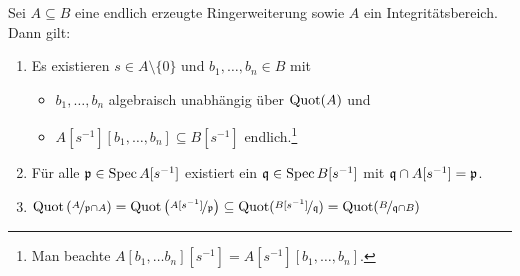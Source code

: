 \documentclass[12pt,a4paper]{scrartcl}
\theoremstyle{cplain}
\theoremstyle{cdef}
\begin{document}
\begin{kor} \label{kor:7.17}
	Sei $A \subseteq B$ eine endlich erzeugte Ringerweiterung sowie $A$ ein Integritätsbereich. Dann gilt: 
	\begin{enumerate}
		\item \label{kor:7.17:i} Es existieren $s \in A \setminus \{0\}$ und $b_1, \dots , b_n \in B$ mit
		\begin{itemize}
			\item $b_1, \dots , b_n$ algebraisch unabhängig über $\operatorname{Quot}(A)$ und
			\item $A[s^{-1}][b_1,\dots , b_n] \subseteq B[s^{-1}]$ endlich.\footnote{Man beachte $A[b_1, \dots b_n][s^{-1}]=A[s^{-1}][b_1, \dots , b_n]$.}
		\end{itemize}
		\item Für alle $\mathfrak{p}\in\operatorname{Spec} A [s^{-1}]$ existiert ein $\mathfrak{q} \in \operatorname{Spec} B[s^{-1}]$ mit $\mathfrak{q} \cap A[s^{-1}]=\mathfrak{p}$. \label{kor:7.17:ii}
		\item $\operatorname{Quot}\left( \nicefrac{A}{\mathfrak{p} \cap A} \right)=\operatorname{Quot} \left( \nicefrac{A[s^{-1}]}{\mathfrak{p}} \right) \subseteq \operatorname{Quot}(\nicefrac{B[s^{-1}]}{\mathfrak{q}})=\operatorname{Quot}(\nicefrac{B}{\mathfrak{q} \cap B})$ \label{kor:7.17:iii}
	\end{enumerate}
\end{kor}
\end{document}
